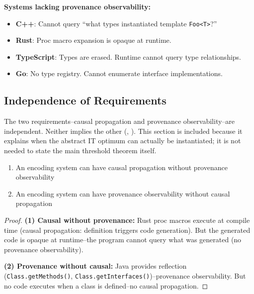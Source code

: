 \textbf{Systems lacking provenance observability:}
\begin{itemize}
\tightlist
\item \textbf{C++}: Cannot query ``what types instantiated template \texttt{Foo<T>}?''
\item \textbf{Rust}: Proc macro expansion is opaque at runtime.
\item \textbf{TypeScript}: Types are erased. Runtime cannot query type relationships.
\item \textbf{Go}: No type registry. Cannot enumerate interface implementations.
\end{itemize}

\subsection{Independence of Requirements}\label{sec:independence}

The two requirements--causal propagation and provenance observability--are independent. Neither implies the other (, ). This section is included because it explains when the abstract IT optimum can actually be instantiated; it is not needed to state the main threshold theorem itself.

\begin{theorem}\label{thm:independence}
\begin{enumerate}
\tightlist
\item An encoding system can have causal propagation without provenance observability
\item An encoding system can have provenance observability without causal propagation
\end{enumerate}
\end{theorem}

\begin{proof}
\textbf{(1) Causal without provenance:} Rust proc macros execute at compile time (causal propagation: definition triggers code generation). But the generated code is opaque at runtime--the program cannot query what was generated (no provenance observability).

\textbf{(2) Provenance without causal:} Java provides reflection (\texttt{Class.getMethods()}, \texttt{Class.getInterfaces()})--provenance observability. But no code executes when a class is defined--no causal propagation.
\end{proof}

